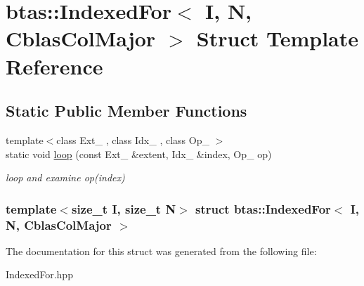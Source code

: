 \hypertarget{structbtas_1_1_indexed_for_3_01_i_00_01_n_00_01_cblas_col_major_01_4}{
\section{btas::IndexedFor$<$ I, N, CblasColMajor $>$ Struct Template Reference}
\label{structbtas_1_1_indexed_for_3_01_i_00_01_n_00_01_cblas_col_major_01_4}
}
\subsection*{Static Public Member Functions}
\begin{DoxyCompactItemize}
\item 
\hypertarget{structbtas_1_1_indexed_for_3_01_i_00_01_n_00_01_cblas_col_major_01_4_afca41e86aa464594a3e9a4f98a28f595}{
{\footnotesize template$<$class Ext\_\- , class Idx\_\- , class Op\_\- $>$ }\\static void \hyperlink{structbtas_1_1_indexed_for_3_01_i_00_01_n_00_01_cblas_col_major_01_4_afca41e86aa464594a3e9a4f98a28f595}{loop} (const Ext\_\- \&extent, Idx\_\- \&index, Op\_\- op)}
\label{structbtas_1_1_indexed_for_3_01_i_00_01_n_00_01_cblas_col_major_01_4_afca41e86aa464594a3e9a4f98a28f595}

\begin{DoxyCompactList}\small\item\em loop and examine op(index) \item\end{DoxyCompactList}\end{DoxyCompactItemize}
\subsubsection*{template$<$size\_\-t I, size\_\-t N$>$ struct btas::IndexedFor$<$ I, N, CblasColMajor $>$}



The documentation for this struct was generated from the following file:\begin{DoxyCompactItemize}
\item 
IndexedFor.hpp\end{DoxyCompactItemize}
